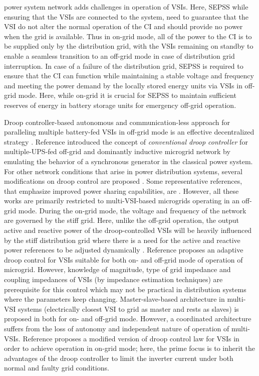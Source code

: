 \documentclass[journal]{IEEEtran}
\begin{document}
power system network adds challenges in operation of VSIs. Here, SEPSS while ensuring that the VSIs are connected to the system, need to guarantee that the VSI do not alter the normal operation of the CI and  should provide no power when the grid is available. Thus in on-grid mode, all of the power to the CI is to be supplied only by the distribution grid, with the VSIs remaining on standby to enable a seamless transition to an off-grid mode in case of distribution grid interruption. In case of a failure of the distribution grid, SEPSS is required to ensure that the CI can function while maintaining a stable voltage and frequency and meeting the power demand by the locally stored energy units via VSIs in off-grid mode. Here, while on-grid it is crucial for SEPSS to maintain sufficient reserves of energy in battery storage units for emergency off-grid operation. 
\par Droop controller-based autonomous and communication-less approach for paralleling multiple battery-fed VSIs in off-grid mode is an effective decentralized strategy \cite{microgrid1}. Reference \cite{chandorkar} introduced the concept of \textit{conventional droop controller} for multiple-UPS-fed off-grid and dominantly inductive microgrid network by emulating the behavior of a synchronous generator in the classical power system. For other network conditions that arise in power distribution systems, several modifications on droop control are proposed \cite{viability,gurrero1,gurrero2,gurrero3,gurrero4,gurrero5,gurrero6,gurrero7}. Some representative references, that emphasize improved power sharing capabilities, are \cite{ghosh,zhong1,zhong2,lampke,bullo,misc1,misc2}. However, all these works are primarily restricted to multi-VSI-based microgrids operating in an off-grid mode. During the on-grid mode, the voltage and frequency of the network are governed by the stiff grid. Here, unlike the off-grid operation, the output active and reactive power of the droop-controlled VSIs will be heavily influenced by the stiff distribution grid where there is a need for the active and reactive power references to be adjusted dynamically \cite{microgrid1,davodi}. Reference \cite{droopgrid1} proposes an adaptive droop control for VSIs suitable for both on- and off-grid mode of operation of microgrid. However, knowledge of magnitude, type of grid impedance and coupling impedances of VSIs (by impedance estimation techniques) are prerequisite for this control which may not be practical in distribution systems where the parameters keep changing. Master-slave-based architecture in multi-VSI systems (electrically closest VSI to grid as master and rests as slaves) is proposed in \cite{droopgrid2,droopgrid3} both for on- and off-grid mode. However, a coordinated architecture suffers from the loss of autonomy and independent nature of operation of multi-VSIs. Reference \cite{droopgrid5} proposes a modified version of droop control law for VSIs in order to achieve operation in on-grid mode; here, the prime focus is to inherit the advantages of the droop controller to limit the inverter current under both normal and faulty grid conditions.
\end{document}

